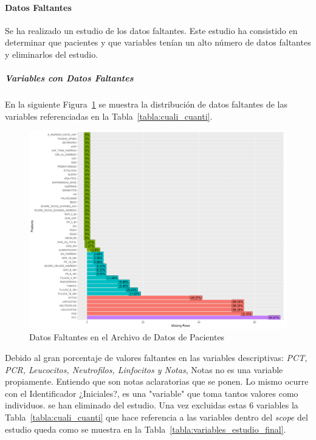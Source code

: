\paragraph{Datos Faltantes}

Se ha realizado un estudio de los datos faltantes. Este estudio ha consistido en determinar que pacientes y que variables tenían un alto número de datos faltantes y eliminarlos del estudio. 

\subparagraph*{Variables con Datos Faltantes} 


En la siguiente Figura~\ref{fig:missing-descriptive} se muestra la distribución de datos faltantes de las variables referenciadas en la Tabla~\ref{tabla:cuali_cuanti}. 
\begin{figure}[H]
    \centering
    \includegraphics[scale = 0.70]{./img/missig-data-descriptive.png}
    \caption{Datos Faltantes en el Archivo de Datos de Pacientes}
    \label{fig:missing-descriptive}
\end{figure}

Debido al gran porcentaje de valores faltantes en las variables descriptivas: \textit{PCT, PCR, Leucocitos, Neutrofilos, Linfocitos y Notas}, {\color{blue} Notas no es una variable propiamente. Entiendo que son notas aclaratorias que se ponen. Lo mismo ocurre con el Identificador ¿Iniciales?, es una "variable" que toma tantos valores como individuos.} se han eliminado del estudio. Una vez excluidas estas 6 variables la Tabla~\ref{tabla:cuali_cuanti} que hace referencia a las variables dentro del \textit{scope} del estudio queda como se muestra en la Tabla~\ref{tabla:variables_estudio_final}.

